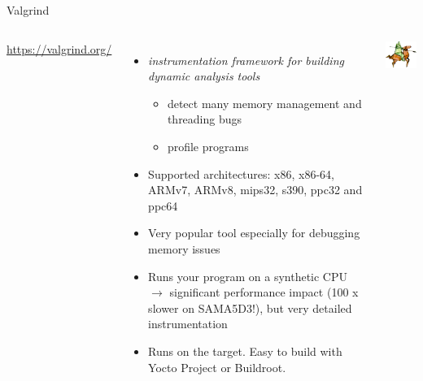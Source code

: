 \begin{frame}{Valgrind}
  \begin{columns}[T]
    \url{https://valgrind.org/}
    \begin{itemize}
    \item {\em instrumentation framework for building dynamic analysis tools}
      \begin{itemize}
      \item detect many memory management and threading bugs
      \item profile programs
      \end{itemize}
    \item Supported architectures: x86, x86-64, ARMv7, ARMv8, mips32,
      s390, ppc32 and ppc64
    \item Very popular tool especially for debugging memory issues
    \item Runs your program on a synthetic CPU $\rightarrow$
      significant performance impact (100 x slower on SAMA5D3!),
      but very detailed instrumentation
    \item Runs on the target. Easy to build with Yocto Project
	  or Buildroot.
    \end{itemize}
    \includegraphics[width=\textwidth]{common/valgrind1.png}
  \end{columns}
\end{frame}

